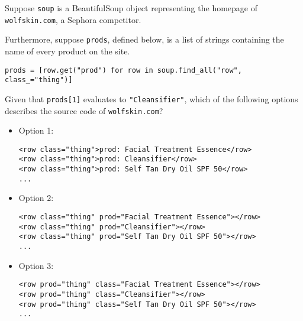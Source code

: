 \documentclass[twoside,12pt]{article}
\begin{document}
\begin{probset}
\begin{prob}

Suppose \texttt{soup} is a BeautifulSoup object representing the homepage of \texttt{wolfskin.com}, a Sephora competitor.

Furthermore, suppose \texttt{prods}, defined below, is a list of strings containing the name of every product on the site.

\begin{verbatim}
prods = [row.get("prod") for row in soup.find_all("row", class_="thing")]
\end{verbatim}

Given that \texttt{prods[1]} evaluates to \texttt{"Cleansifier"}, which of the following options describes the source code of \texttt{wolfskin.com}?

\vspace{0.3in}

\begin{itemize}

\item Option 1:

\begin{verbatim}
<row class="thing">prod: Facial Treatment Essence</row>
<row class="thing">prod: Cleansifier</row>
<row class="thing">prod: Self Tan Dry Oil SPF 50</row>
...
\end{verbatim}

\vspace{0.1in}

\item Option 2:

\begin{verbatim}
<row class="thing" prod="Facial Treatment Essence"></row>
<row class="thing" prod="Cleansifier"></row>
<row class="thing" prod="Self Tan Dry Oil SPF 50"></row>
...
\end{verbatim}

\vspace{0.1in}

\item Option 3:

\begin{verbatim}
<row prod="thing" class="Facial Treatment Essence"></row>
<row prod="thing" class="Cleansifier"></row>
<row prod="thing" class="Self Tan Dry Oil SPF 50"></row>
...
\end{verbatim}

\vspace{0.1in}


\end{itemize}
\end{prob}
\end{probset}
\end{document}
